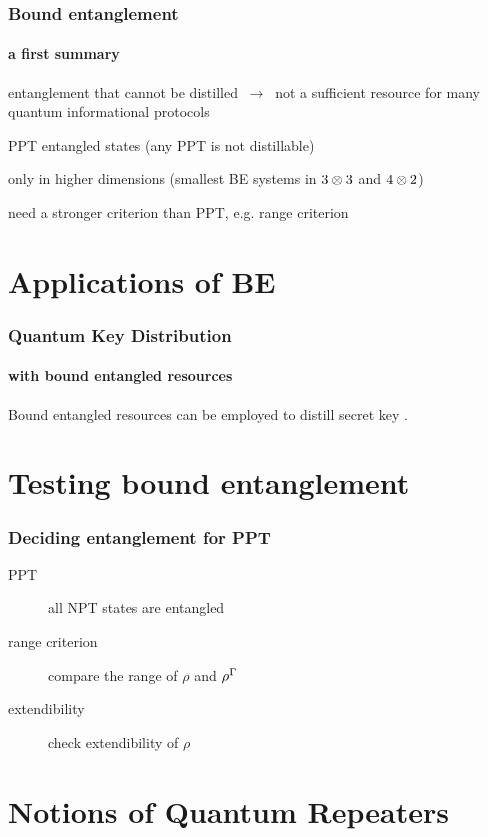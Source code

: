 \documentclass[compress,notes=hide]{beamer}
\begin{document}
\begin{frame}
\frametitle{Bound entanglement}
\framesubtitle{a first summary}

\begin{description}[<+->]
  \item[def] entanglement that cannot be distilled $\ \rightarrow \ $ not a sufficient resource for many quantum informational protocols
  \item[construction] PPT entangled states (any PPT is not distillable)
  \item[existence] only in higher dimensions (smallest BE systems in $3\otimes 3$ and $4\otimes 2$)
  \item[detection] need a stronger criterion than PPT, e.g. range criterion
\end{description}

\end{frame}

\section[Applications]{Applications of BE}

\begin{frame}
\frametitle{Quantum Key Distribution}
\framesubtitle{with bound entangled resources}

Bound entangled resources can be employed to distill secret key \cite{Sec_key_b_ent}.

\end{frame}

\section[Detection]{Testing bound entanglement}

\begin{frame}
\frametitle{Deciding entanglement for PPT}

\begin{description}
  \item[PPT] all NPT states are entangled
  \item[range criterion] compare the range of $\rho$ and $\rho^{\Gamma}$
  \item[extendibility] check extendibility of $\rho$
\end{description}

\end{frame}


\section[Quant Repeaters]{Notions of Quantum Repeaters}
\end{document}
